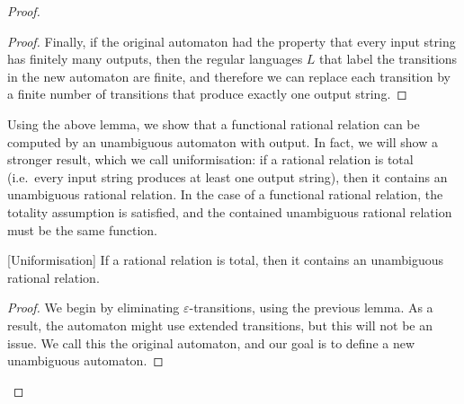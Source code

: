 \begin{proof}
\begin{proof}
            Finally, if the original automaton had the property that every input string has finitely many outputs, then the regular languages $L$ that label the transitions in the new automaton are finite, and therefore we can replace each transition by a finite number of transitions that produce exactly one output string. 
        \end{proof}

    Using the above lemma, we show that a functional rational relation can be computed by an unambiguous automaton with output. 
    In fact, we will show a stronger result, which we call uniformisation: if a rational relation is total (i.e.~every input string produces at least one output string), then it contains an unambiguous rational relation. In the case of a functional rational relation, the totality assumption is satisfied, and the contained unambiguous rational relation must be the same function.

    \begin{lemma}\label{lem:uniformisation}
        [Uniformisation] If a rational relation is total, then it contains an unambiguous rational relation.
    \end{lemma}
    \begin{proof}
        We begin by eliminating $\varepsilon$-transitions, using the previous lemma. As a result, the automaton might use extended transitions, but this  will not be an issue. We call this the original automaton, and our goal is to define a new unambiguous automaton. 
        

\end{proof}
\end{proof}
